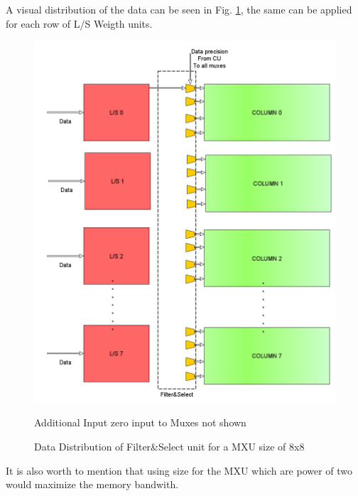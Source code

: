 A visual distribution of the data can be seen in Fig. \ref{fig:fscs}, the same can be applied for each row of L/S Weigth units.
\begin{figure}[H]
\centering
\captionsetup{justification=centering}
\includegraphics[scale=0.35,angle=0]{./figure/filter_and_select.png}
\caption{Data Distribution of Filter\&Select unit for a MXU size of 8x8
}
  \small Additional Input zero input to Muxes not shown
\label{fig:fscs}
\end{figure} 

It is also worth to mention that using size for the MXU which are power of two would maximize the memory bandwith.

\newpage
